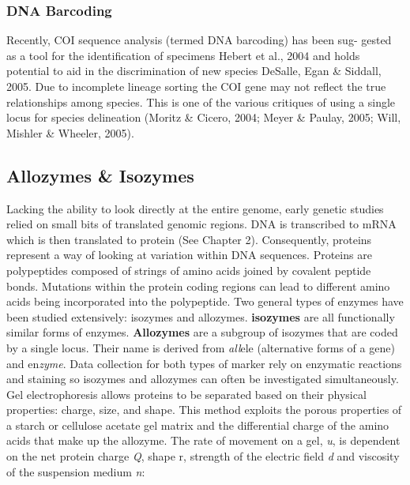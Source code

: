 \documentclass[11pt, oneside]{article}
\begin{document}
\subsubsection{DNA Barcoding}
Recently, COI sequence analysis (termed DNA barcoding) has been sug- gested as a tool for the identification of specimens Hebert et al., 2004 and holds potential to aid in the discrimination of new species DeSalle, Egan \& Siddall, 2005.
Due to incomplete lineage sorting the COI gene may not reflect the true relationships among species. This is one of the various critiques of using a single locus for species delineation (Moritz \& Cicero, 2004; Meyer \& Paulay, 2005; Will, Mishler \& Wheeler, 2005). 










\subsection{Allozymes \& Isozymes}
Lacking the ability to look directly at the entire genome, early genetic studies relied on small bits of translated 
genomic regions. DNA is transcribed to mRNA which is then translated to protein (See Chapter 2). Consequently,
proteins represent a way of looking at variation within DNA sequences. Proteins are polypeptides 
composed of strings of amino acids joined by covalent peptide bonds. Mutations within the protein coding 
regions can lead to different amino acids being incorporated into the polypeptide. Two general types of enzymes 
have been studied extensively:  isozymes and allozymes.  \textbf{isozymes} are all functionally similar forms of 
enzymes. \textbf{Allozymes} are a subgroup of isozymes that are coded by a single locus. 
Their name is derived from \textit{all}ele (alternative forms of a gene) and en\textit{zyme}. Data collection for 
both types of marker rely on enzymatic reactions and staining so isozymes and allozymes can often be 
investigated simultaneously.
Gel electrophoresis allows proteins to be separated based on their physical properties: charge, size, and shape. 
This method exploits the porous properties of a starch or cellulose acetate gel matrix and the differential charge 
of the amino acids that make up the allozyme. The rate of movement on a gel, \textit{u}, is dependent on the net
protein charge \textit{Q}, shape {r}, strength of the electric field \textit{d} and viscosity of the suspension 
medium \textit{n}:
\end{document}
